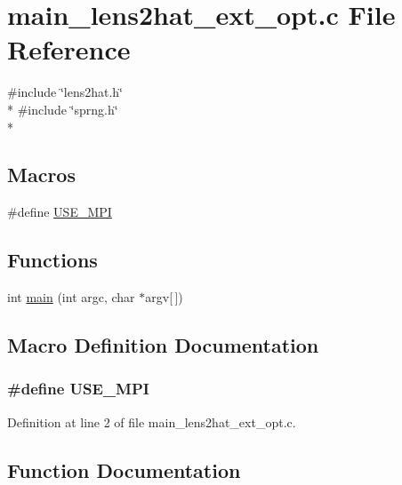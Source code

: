 \section{main\-\_\-lens2hat\-\_\-ext\-\_\-opt.\-c File Reference}
\label{main__lens2hat__ext__opt_8c}
{\ttfamily \#include \char`\"{}lens2hat.\-h\char`\"{}}\\*
{\ttfamily \#include \char`\"{}sprng.\-h\char`\"{}}\\*
\subsection*{Macros}
\begin{DoxyCompactItemize}
\item 
\#define \hyperlink{main__lens2hat__ext__opt_8c_a3869d282031f6ea6b50fdb980b758420}{U\-S\-E\-\_\-\-M\-P\-I}
\end{DoxyCompactItemize}
\subsection*{Functions}
\begin{DoxyCompactItemize}
\item 
int \hyperlink{main__lens2hat__ext__opt_8c_a0ddf1224851353fc92bfbff6f499fa97}{main} (int argc, char $\ast$argv\mbox{[}$\,$\mbox{]})
\end{DoxyCompactItemize}


\subsection{Macro Definition Documentation}
\subsubsection[{U\-S\-E\-\_\-\-M\-P\-I}]{\setlength{\rightskip}{0pt plus 5cm}\#define U\-S\-E\-\_\-\-M\-P\-I}\label{main__lens2hat__ext__opt_8c_a3869d282031f6ea6b50fdb980b758420}


Definition at line 2 of file main\-\_\-lens2hat\-\_\-ext\-\_\-opt.\-c.



\subsection{Function Documentation}
